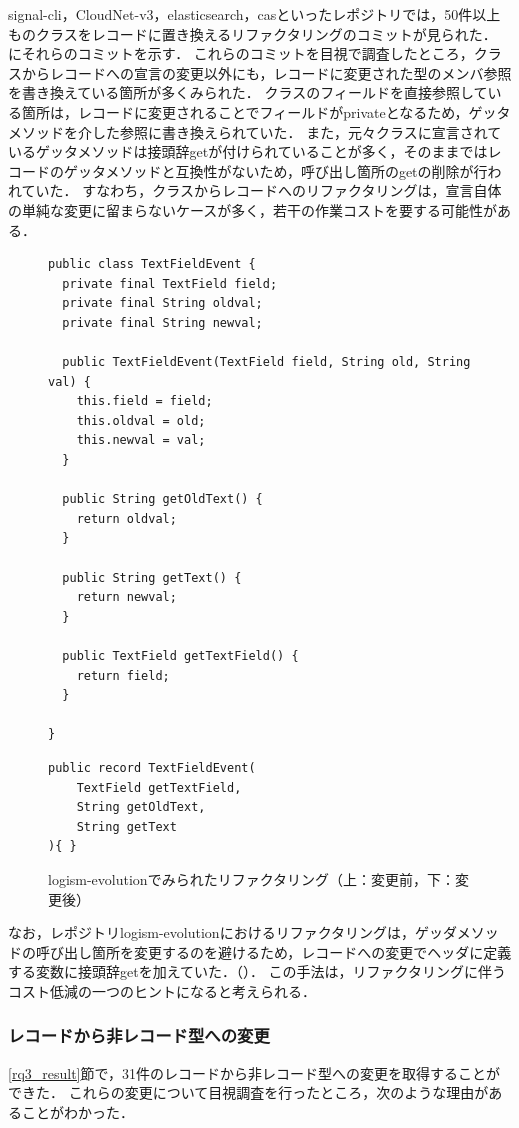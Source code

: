 signal-cli，CloudNet-v3，elasticsearch，casといったレポジトリでは，50件以上ものクラスをレコードに置き換えるリファクタリングのコミットが見られた．
にそれらのコミットを示す．
これらのコミットを目視で調査したところ，クラスからレコードへの宣言の変更以外にも，レコードに変更された型のメンバ参照を書き換えている箇所が多くみられた．
クラスのフィールドを直接参照している箇所は，レコードに変更されることでフィールドがprivateとなるため，ゲッタメソッドを介した参照に書き換えられていた．
また，元々クラスに宣言されているゲッタメソッドは接頭辞getが付けられていることが多く，そのままではレコードのゲッタメソッドと互換性がないため，呼び出し箇所のgetの削除が行われていた．
すなわち，クラスからレコードへのリファクタリングは，宣言自体の単純な変更に留まらないケースが多く，若干の作業コストを要する可能性がある．

\begin{figure}[t]
\begin{lstlisting}
public class TextFieldEvent {
  private final TextField field;
  private final String oldval;
  private final String newval;
  
  public TextFieldEvent(TextField field, String old, String val) {
    this.field = field;
    this.oldval = old;
    this.newval = val;
  }
  
  public String getOldText() {
    return oldval;
  }

  public String getText() {
    return newval;
  }

  public TextField getTextField() {
    return field;
  }
  
}
\end{lstlisting}
\begin{lstlisting}
public record TextFieldEvent(
    TextField getTextField,
    String getOldText,
    String getText
){ }
\end{lstlisting}
\caption{logism-evolutionでみられたリファクタリング（上：変更前，下：変更後）}
\label{unique_usage}
\end{figure}

なお，レポジトリlogism-evolutionにおけるリファクタリングは，ゲッダメソッドの呼び出し箇所を変更するのを避けるため，レコードへの変更でヘッダに定義する変数に接頭辞getを加えていた．（）．
この手法は，リファクタリングに伴うコスト低減の一つのヒントになると考えられる．

\subsubsection{レコードから非レコード型への変更}
\ref{rq3_result}節で，31件のレコードから非レコード型への変更を取得することができた．
これらの変更について目視調査を行ったところ，次のような理由があることがわかった．

